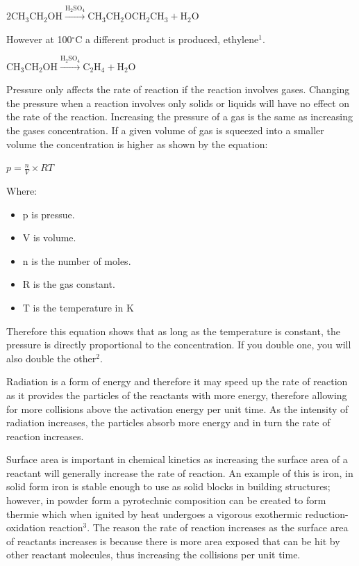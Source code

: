 $\mathrm{2CH_3CH_2OH}\xrightarrow{\mathrm{H_2SO_4}}\mathrm{CH_3CH_2OCH_2CH_3}+\mathrm{H_2O}$

However at 100$^{\circ}$C a different product is produced, ethylene$^1$.

$\mathrm{CH_3CH_2OH}\xrightarrow{\mathrm{H_2SO_4}}\mathrm{C_2H_4}+\mathrm{H_2O}$

Pressure only affects the rate of reaction if the reaction involves gases. Changing the pressure when a reaction involves only solids or liquids will have no effect on the rate of the reaction. Increasing the pressure of a gas is the same as increasing the gases concentration. If a given volume of gas is squeezed into a smaller volume the concentration is higher as shown by the equation:

 $p= \frac{n}{V}\times{RT}$

Where:
\begin{itemize}
\item p is pressue.
\item V is volume.
\item n is the number of moles.
\item R is the gas constant.
\item T is the temperature in K
\end{itemize}

Therefore this equation shows that as long as the temperature is constant, the pressure is directly proportional to the concentration. If you double one, you will also double the other$^2$.

Radiation is a form of energy and therefore it may speed up the rate of reaction as it provides the particles of the reactants with more energy, therefore allowing for more collisions above the activation energy per unit time. As the intensity of radiation increases, the particles absorb more energy and in turn the rate of reaction increases.

Surface area is important in chemical kinetics as increasing the surface area of a reactant will generally increase the rate of reaction. An example of this is iron, in solid form iron is stable enough to use as solid blocks in building structures; however, in powder form a pyrotechnic composition can be created to form thermie which when ignited by heat undergoes a vigorous exothermic reduction-oxidation reaction$^3$. The reason the rate of reaction increases as the surface area of reactants increases is because there is more area exposed that can be hit by other reactant molecules, thus increasing the collisions per unit time.

